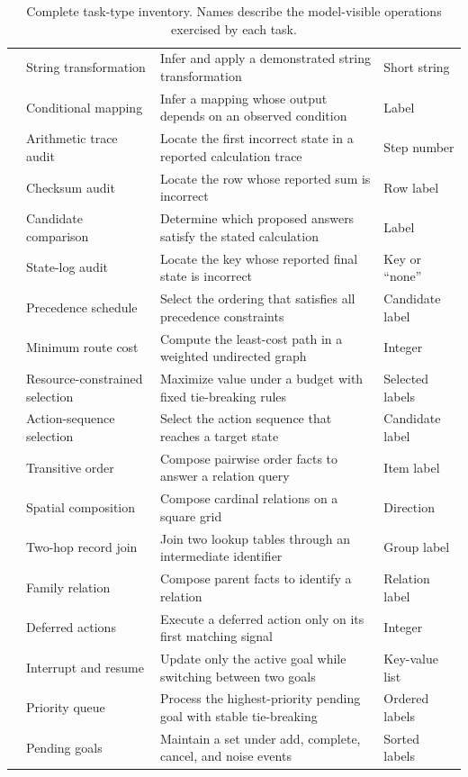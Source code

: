 \documentclass[sigconf,anonymous,review]{acmart}
\begin{document}
\begin{table}[!t]
\begin{tabularx}{\textwidth}{@{}L{2.55cm}L{2.7cm}YL{1.7cm}@{}}
& String transformation & Infer and apply a demonstrated string transformation & Short string \\
& Conditional mapping & Infer a mapping whose output depends on an observed condition & Label \\
\addlinespace
{}
& Arithmetic trace audit & Locate the first incorrect state in a reported calculation trace & Step number \\
& Checksum audit & Locate the row whose reported sum is incorrect & Row label \\
& Candidate comparison & Determine which proposed answers satisfy the stated calculation & Label \\
& State-log audit & Locate the key whose reported final state is incorrect & Key or ``none'' \\
\addlinespace
{}
& Precedence schedule & Select the ordering that satisfies all precedence constraints & Candidate label \\
& Minimum route cost & Compute the least-cost path in a weighted undirected graph & Integer \\
& Resource-constrained selection & Maximize value under a budget with fixed tie-breaking rules & Selected labels \\
& Action-sequence selection & Select the action sequence that reaches a target state & Candidate label \\
\addlinespace
{}
& Transitive order & Compose pairwise order facts to answer a relation query & Item label \\
& Spatial composition & Compose cardinal relations on a square grid & Direction \\
& Two-hop record join & Join two lookup tables through an intermediate identifier & Group label \\
& Family relation & Compose parent facts to identify a relation & Relation label \\
\addlinespace
{}
& Deferred actions & Execute a deferred action only on its first matching signal & Integer \\
& Interrupt and resume & Update only the active goal while switching between two goals & Key-value list \\
& Priority queue & Process the highest-priority pending goal with stable tie-breaking & Ordered labels \\
& Pending goals & Maintain a set under add, complete, cancel, and noise events & Sorted labels \\
\bottomrule
\end{tabularx}
\caption{Complete task-type inventory. Names describe the model-visible
operations exercised by each task.}
\label{tab:inventory}
\end{table}
\end{document}

